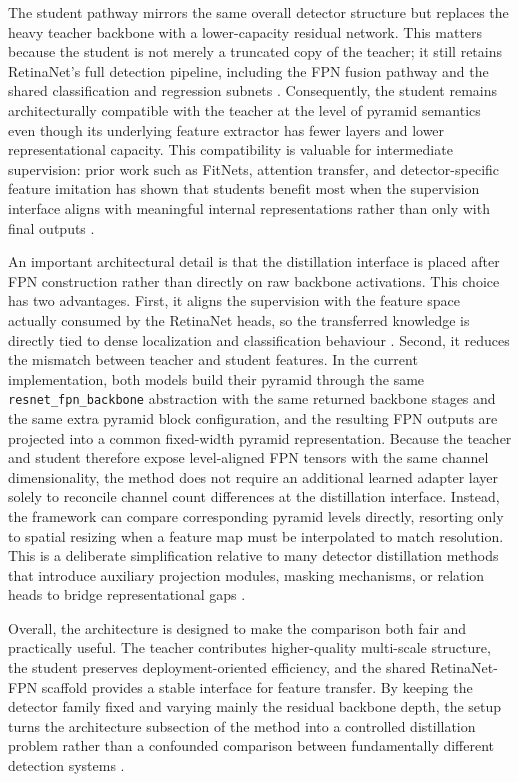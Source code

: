 \documentclass[12pt]{article}
\begin{document}
The student pathway mirrors the same overall detector structure but replaces the heavy teacher backbone with a lower-capacity residual network. This matters because the student is not merely a truncated copy of the teacher; it still retains RetinaNet's full detection pipeline, including the FPN fusion pathway and the shared classification and regression subnets \cite{lin2017focal}. Consequently, the student remains architecturally compatible with the teacher at the level of pyramid semantics even though its underlying feature extractor has fewer layers and lower representational capacity. This compatibility is valuable for intermediate supervision: prior work such as FitNets, attention transfer, and detector-specific feature imitation has shown that students benefit most when the supervision interface aligns with meaningful internal representations rather than only with final outputs \cite{romero2015fitnets,zagoruyko2017paying,chen2017learning,wang2019distilling,yang2022focal}.

An important architectural detail is that the distillation interface is placed after FPN construction rather than directly on raw backbone activations. This choice has two advantages. First, it aligns the supervision with the feature space actually consumed by the RetinaNet heads, so the transferred knowledge is directly tied to dense localization and classification behaviour \cite{lin2017fpn,lin2017focal}. Second, it reduces the mismatch between teacher and student features. In the current implementation, both models build their pyramid through the same \texttt{resnet\_fpn\_backbone} abstraction with the same returned backbone stages and the same extra pyramid block configuration, and the resulting FPN outputs are projected into a common fixed-width pyramid representation. Because the teacher and student therefore expose level-aligned FPN tensors with the same channel dimensionality, the method does not require an additional learned adapter layer solely to reconcile channel count differences at the distillation interface. Instead, the framework can compare corresponding pyramid levels directly, resorting only to spatial resizing when a feature map must be interpolated to match resolution. This is a deliberate simplification relative to many detector distillation methods that introduce auxiliary projection modules, masking mechanisms, or relation heads to bridge representational gaps \cite{chen2017learning,wang2019distilling,yang2022focal}.

Overall, the architecture is designed to make the comparison both fair and practically useful. The teacher contributes higher-quality multi-scale structure, the student preserves deployment-oriented efficiency, and the shared RetinaNet-FPN scaffold provides a stable interface for feature transfer. By keeping the detector family fixed and varying mainly the residual backbone depth, the setup turns the architecture subsection of the method into a controlled distillation problem rather than a confounded comparison between fundamentally different detection systems \cite{he2016resnet,lin2017fpn,lin2017focal,hinton2015distilling,wang2019distilling}.
\end{document}
